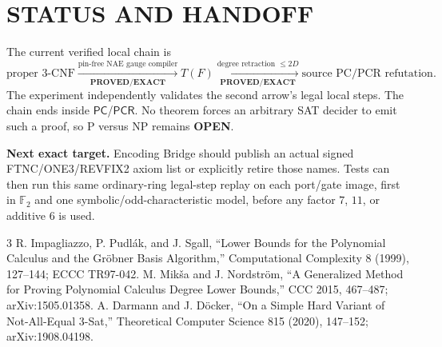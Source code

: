 \documentclass[11pt]{article}
\newcommand{\PC}{\ensuremath{\mathsf{PC}}}
\newcommand{\PCR}{\ensuremath{\mathsf{PCR}}}
\newcommand{\EXACT}{\textbf{PROVED/EXACT}}
\newcommand{\OPEN}{\textbf{OPEN}}
\begin{document}
\section{STATUS AND HANDOFF}
The current verified local chain is
\[
\text{proper 3-CNF}
\xrightarrow[\EXACT]{\text{pin-free NAE gauge compiler}}
T(F)
\xrightarrow[\EXACT]{\text{degree retraction }\le2D}
\text{source PC/PCR refutation}.
\]
The experiment independently validates the second arrow's legal local steps.
The chain ends inside \PC/\PCR.  No theorem forces an arbitrary SAT decider to
emit such a proof, so P versus NP remains \OPEN.

\textbf{Next exact target.}  Encoding Bridge should publish an actual signed
FTNC/ONE3/REVFIX2 axiom list or explicitly retire those names.  Tests can then
run this same ordinary-ring legal-step replay on each port/gate image, first in
$\mathbb F_2$ and one symbolic/odd-characteristic model, before any factor
$7$, $11$, or additive $6$ is used.

\begin{thebibliography}{3}
 R. Impagliazzo, P. Pudl\'ak, and J. Sgall,
``Lower Bounds for the Polynomial Calculus and the Gr\"obner Basis
Algorithm,'' Computational Complexity 8 (1999), 127--144; ECCC TR97-042.
 M. Mik\v{s}a and J. Nordstr\"om,
``A Generalized Method for Proving Polynomial Calculus Degree Lower Bounds,''
CCC 2015, 467--487; arXiv:1505.01358.
 A. Darmann and J. D\"ocker,
``On a Simple Hard Variant of Not-All-Equal 3-Sat,''
Theoretical Computer Science 815 (2020), 147--152; arXiv:1908.04198.
\end{thebibliography}
\end{document}
